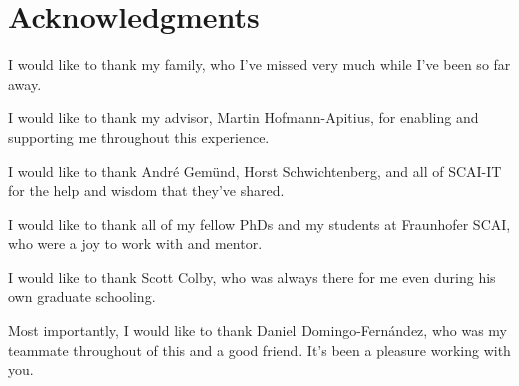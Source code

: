 \chapter*{Acknowledgments}

I would like to thank my family, who I've missed very much while I've been so far away.

I would like to thank my advisor, Martin Hofmann-Apitius, for enabling and supporting me throughout this experience.

I would like to thank André Gemünd, Horst Schwichtenberg, and all of SCAI-IT for the help and wisdom that they've shared.

I would like to thank all of my fellow PhDs and my students at Fraunhofer SCAI, who were a joy to work with and mentor.

I would like to thank Scott Colby, who was always there for me even during his own graduate schooling.

Most importantly, I would like to thank Daniel Domingo-Fern\'{a}ndez, who was my teammate throughout of this and a good friend.
It's been a pleasure working with you.
